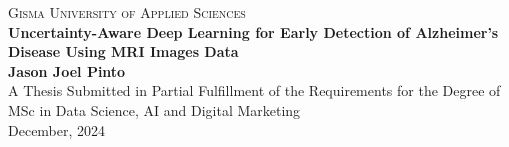 \documentclass[12pt,twocolumn]{report}
\begin{document}

\begin{titlepage}
    \begin{center}
        
        \textsc{\Large Gisma University of Applied Sciences} \\[1.5cm]
        \vfill  
        {\bfseries\Huge Uncertainty-Aware Deep Learning for Early Detection of Alzheimer’s Disease Using MRI Images Data \\[0.4cm]}
        \vfill        
        {\Large \textbf{Jason Joel Pinto}} \\[2cm]
        \vfill
        {\large A Thesis Submitted in Partial Fulfillment of the Requirements for the Degree of} \\[0.5cm]
        {\Large MSc in Data Science, AI and Digital Marketing} \\[1.5cm]
        
        {\large December, 2024}
        
        \vfill
    \end{center}
\end{titlepage}
\end{document}
